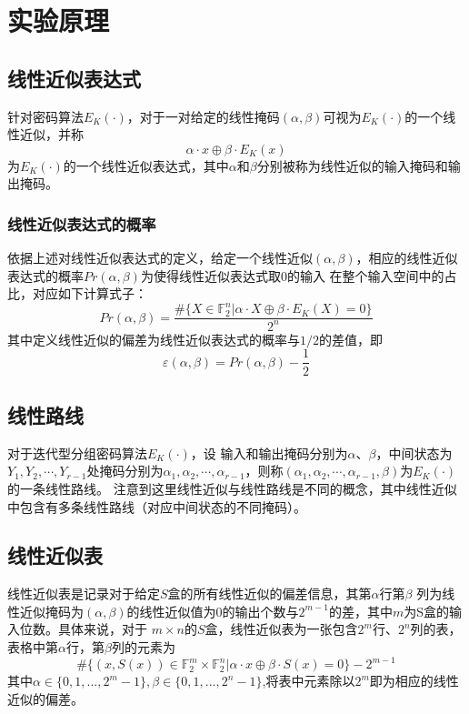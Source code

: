 \section{实验原理}
\subsection{线性近似表达式}
针对密码算法$E_K(\cdot)$，对于一对给定的线性掩码$(\alpha,\beta)$可视为$E_K(\cdot)$的一个线性近似，并称
$$
\alpha \cdot x \oplus \beta \cdot E_K(x)
$$
为$E_K(\cdot)$的一个线性近似表达式，其中$\alpha$和$\beta$分别被称为线性近似的输入掩码和输出掩码。

\subsubsection{线性近似表达式的概率}
依据上述对线性近似表达式的定义，给定一个线性近似$(\alpha,\beta)$，相应的线性近似表达式的概率$Pr(\alpha,\beta)$为使得线性近似表达式取0的输入
在整个输入空间中的占比，对应如下计算式子：
$$
Pr(\alpha,\beta) = \frac{\# \{ X \in \mathbb{F}_2^n | \alpha \cdot X \oplus \beta \cdot E_K(X) = 0  \}  }{2^n}
$$
其中定义线性近似的偏差为线性近似表达式的概率与$1/2$的差值，即
$$
\varepsilon(\alpha,\beta) = Pr(\alpha,\beta) - \frac{1}{2}
$$

\subsection{线性路线}
对于迭代型分组密码算法$E_K(\cdot)$，设 输入和输出掩码分别为$\alpha$、$\beta$，中间状态为
$Y_1,Y_2,\cdots,Y_{r-1}$处掩码分别为$\alpha_1,\alpha_2,\cdots,\alpha_{r-1}$，则称$(\alpha_1,\alpha_2,\cdots,\alpha_{r-1},\beta)$为$E_K(\cdot)$的一条线性路线。
注意到这里线性近似与线性路线是不同的概念，其中线性近似中包含有多条线性路线（对应中间状态的不同掩码）。

\subsection{线性近似表}
线性近似表是记录对于给定$S$盒的所有线性近似的偏差信息，其第$\alpha$行第$\beta$
列为线性近似掩码为$(\alpha,\beta)$的线性近似值为0的输出个数与$2^{m-1}$的差，其中$m$为S盒的输入位数。具体来说，对于
$m \times n$的$S$盒，线性近似表为一张包含$2^m$行、$2^n$列的表，表格中第$\alpha$行，第$\beta$列的元素为
$$
\#\{   (x,S(x)) \in \mathbb{F}_2^m \times \mathbb{F}_2^n | \alpha \cdot x \oplus \beta \cdot S(x) = 0 \} - 2^{m-1}
$$
其中\(\alpha \in \{0,1,...,2^m-1 \},\beta \in \{0,1,...,2^n-1 \} \),将表中元素除以$2^m$即为相应的线性近似的偏差。
